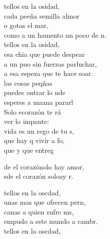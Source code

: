 \begin{cancion}%
	tellos en la osidad,\\
	cada peeña semilla almor\\
	o gotas  el mar,\\
	como a un hamento un poco de n.\\
	\jump
	tellos en la osidad,\\
	esa chia que puede despear\\
	a un puo sin fuerzas parluchar,\\
	a esa espeza que te hace soar.\\
	\jump
	 las cosas peqñas \\
	puedes ontrar lo nde\\
	esperes a maana pararl \\
	Solo ecorazón te rá \\
	ver lo impante:  \\
	 vida es un rego de tu s,\\
	que hay q vivir a fo, \\
	que y que entreg    \jump\\
	\begin{chorus}%
		de el corazónolo hay amor,\\
		sde el corazón soloay r.\jump\\
	\end{chorus}%
	tellos en la oscdad,\\
	unas mas que ofrecen pern,\\
	canas a quien sufre ms,\\
	empudo a este mundo a cambr.\\
	\jump
	tellos en la oscdad,\\

\end{cancion}
